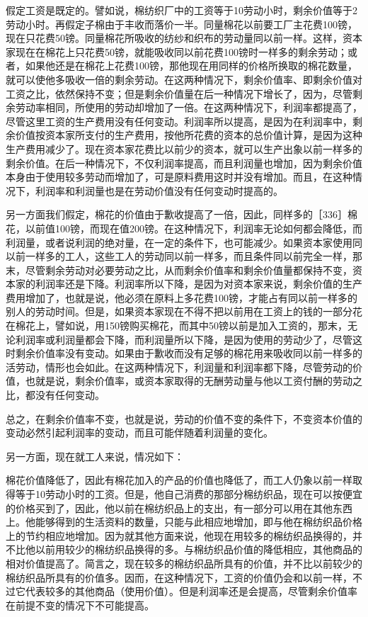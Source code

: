 假定工资是既定的。譬如说，棉纺织厂中的工资等于10劳动小时，剩余价值等于2劳动小时。再假定子棉由于丰收而落价一半。同量棉花以前要工厂主花费100镑，现在只花费50镑。同量棉花所吸收的纺纱和织布的劳动量同以前一样。这样，资本家现在在棉花上只花费50镑，就能吸收同以前花费100镑时一样多的剩余劳动；或者，如果他还是在棉花上花费100镑，那他现在用同样的价格所换取的棉花数量，就可以使他多吸收一倍的剩余劳动。在这两种情况下，剩余价值率、即剩余价值对工资之比，依然保持不变；但是剩余价值量在后一种情况下增长了，因为，尽管剩余劳动率相同，所使用的劳动却增加了一倍。在这两种情况下，利润率都提高了，尽管这里工资的生产费用没有任何变动。利润率所以提高，是因为在利润率中，剩余价值按资本家所支付的生产费用，按他所花费的资本的总价值计算，是因为这种生产费用减少了。现在资本家花费比以前少的资本，就可以生产出象以前一样多的剩余价值。在后一种情况下，不仅利润率提高，而且利润量也增加，因为剩余价值本身由于使用较多劳动而增加了，可是原料费用这时并没有增加。而且，在这种情况下，利润率和利润量也是在劳动价值没有任何变动时提高的。

另一方面我们假定，棉花的价值由于歉收提高了一倍，因此，同样多的［336］棉花，以前值100镑，而现在值200镑。在这种情况下，利润率无论如何都会降低，而利润量，或者说利润的绝对量，在一定的条件下，也可能减少。如果资本家使用同以前一样多的工人，这些工人的劳动同以前一样多，而且条件同以前完全一样，那末，尽管剩余劳动对必要劳动之比，从而剩余价值率和剩余价值量都保持不变，资本家的利润率还是下降。利润率所以下降，是因为对资本家来说，剩余价值的生产费用增加了，也就是说，他必须在原料上多花费100镑，才能占有同以前一样多的别人的劳动时间。但是，如果资本家现在不得不把以前用在工资上的钱的一部分花在棉花上，譬如说，用150镑购买棉花，而其中50镑以前是加入工资的，那末，无论利润率或利润量都会下降，而利润量所以下降，是因为使用的劳动少了，尽管这时剩余价值率没有变动。如果由于歉收而没有足够的棉花用来吸收同以前一样多的活劳动，情形也会如此。在这两种情况下，利润量和利润率都下降，尽管劳动的价值，也就是说，剩余价值率，或资本家取得的无酬劳动量与他以工资付酬的劳动之比，都没有任何变动。

总之，在剩余价值率不变，也就是说，劳动的价值不变的条件下，不变资本价值的变动必然引起利润率的变动，而且可能伴随着利润量的变化。

另一方面，现在就工人来说，情况如下：

棉花价值降低了，因此有棉花加入的产品的价值也降低了，而工人仍象以前一样取得等于10劳动小时的工资。但是，他自己消费的那部分棉纺织品，现在可以按便宜的价格买到了，因此，他以前在棉纺织品上的支出，有一部分可以用在其他东西上。他能够得到的生活资料的数量，只能与此相应地增加，即与他在棉纺织品价格上的节约相应地增加。因为就其他方面来说，他现在用较多的棉纺织品换得的，并不比他以前用较少的棉纺织品换得的多。与棉纺织品价值的降低相应，其他商品的相对价值提高了。简言之，现在较多的棉纺织品所具有的价值，并不比以前较少的棉纺织品所具有的价值多。因而，在这种情况下，工资的价值仍会和以前一样，不过它代表较多的其他商品（使用价值）。但是利润率还是会提高，尽管剩余价值率在前提不变的情况下不可能提高。

